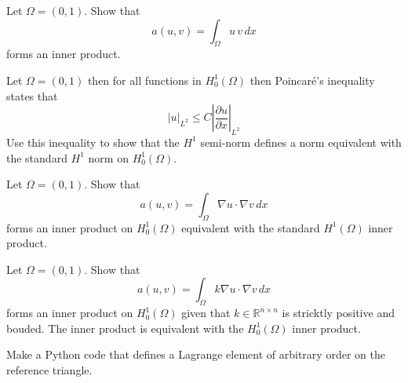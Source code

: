 \begin{exercise}
\label{ex:inner}
Let $\Omega=(0,1)$.  
Show that 
\[  
a(u, v) = \int_\Omega  u \, v \, dx 
\]
forms an inner product.  
\end{exercise}




\begin{exercise}
\label{ex:poincare}

Let $\Omega=(0,1)$ then  
for all functions in $H^1_0(\Omega)$ then
Poincar\'e's inequality states that
\[
|u|_{L^2} \le C  |\frac{\partial u}{\partial x}|_{L^2}   
\]
Use this inequality to show that the $H^1$ semi-norm defines 
a norm equivalent with the standard $H^1$ norm on $H^1_0(\Omega)$.  
\end{exercise}



\begin{exercise}
\label{ex:poincare2}

Let $\Omega=(0,1)$.  
Show that 
\[  
a(u, v) = \int_\Omega \nabla u \cdot \nabla v \, dx 
\]
forms an inner product on $H^1_0(\Omega)$  equivalent with the standard
$H^1(\Omega)$ inner product. 
\end{exercise}

\begin{exercise}
\label{ex:poincare3}

Let $\Omega=(0,1)$.  
Show that 
\[  
a(u, v) = \int_\Omega k \nabla u \cdot \nabla v \, dx 
\]
forms an inner product on $H^1_0(\Omega)$ given that $k \in \mathbb{R}^{n \times n}$ is stricktly positive
and bouded. The inner product is equivalent with the $H^1_0(\Omega)$ inner product.  

\begin{exercise}
Make a Python code that defines a Lagrange element of arbitrary order on the reference triangle. 
\end{exercise}

\end{exercise}



